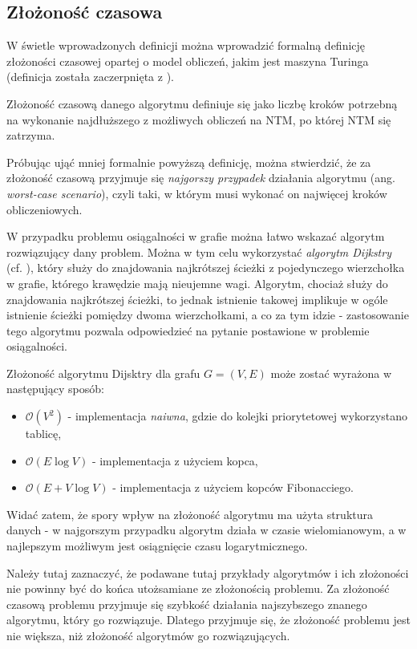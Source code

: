 \subsection{Złożoność czasowa}

W świetle wprowadzonych definicji można wprowadzić formalną definicję złożoności czasowej opartej o model obliczeń, jakim jest maszyna Turinga (definicja została zaczerpnięta z \cite{WazniakZlozonosc}).
\begin{definition}
Złożoność czasową danego algorytmu definiuje się jako liczbę kroków potrzebną na wykonanie najdłuższego z możliwych obliczeń na NTM, po której NTM się zatrzyma.
\end{definition}

Próbując ująć mniej formalnie powyższą definicję, można stwierdzić, że za złożoność czasową przyjmuje się \textit{najgorszy przypadek} działania algorytmu (ang. \textit{worst-case scenario}), czyli taki, w którym musi wykonać on najwięcej kroków obliczeniowych.

W przypadku problemu osiągalności w grafie można łatwo wskazać algorytm rozwiązujący dany problem. Można w tym celu wykorzystać \textit{algorytm Dijkstry} (cf. \cite{Cormen}), który służy do znajdowania najkrótszej ścieżki z pojedynczego wierzchołka w grafie, którego krawędzie mają nieujemne wagi. Algorytm, chociaż służy do znajdowania najkrótszej ścieżki, to jednak istnienie takowej implikuje w ogóle istnienie ścieżki pomiędzy dwoma wierzchołkami, a co za tym idzie - zastosowanie tego algorytmu pozwala odpowiedzieć na pytanie postawione w problemie osiągalności.

Złożoność algorytmu Dijsktry dla grafu $G = (V, E)$ może zostać wyrażona w następujący sposób:
\begin{itemize}
    \item $\mathcal{O}(V^{2})$ - implementacja \textit{naiwna}, gdzie do kolejki priorytetowej wykorzystano tablicę,
    \item $\mathcal{O}(E \log V)$ - implementacja z użyciem kopca,
    \item $\mathcal{O}(E + V \log V)$ - implementacja z użyciem kopców Fibonacciego.
\end{itemize}
Widać zatem, że spory wpływ na złożoność algorytmu ma użyta struktura danych - w najgorszym przypadku algorytm działa w czasie wielomianowym, a w najlepszym możliwym jest osiągnięcie czasu logarytmicznego.

Należy tutaj zaznaczyć, że podawane tutaj przykłady algorytmów i ich złożoności nie powinny być do końca utożsamiane ze złożonością problemu. Za złożoność czasową problemu przyjmuje się szybkość działania najszybszego znanego algorytmu, który go rozwiązuje. Dlatego przyjmuje się, że złożoność problemu jest nie większa, niż złożoność algorytmów go rozwiązujących.


